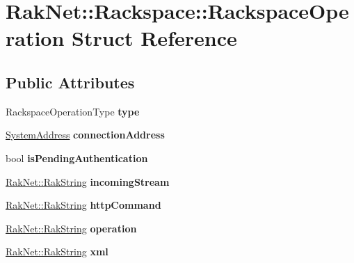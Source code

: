 \hypertarget{struct_rak_net_1_1_rackspace_1_1_rackspace_operation}{\section{Rak\-Net\-:\-:Rackspace\-:\-:Rackspace\-Operation Struct Reference}
\label{struct_rak_net_1_1_rackspace_1_1_rackspace_operation}
}
\subsection*{Public Attributes}
\begin{DoxyCompactItemize}
\item 
\hypertarget{struct_rak_net_1_1_rackspace_1_1_rackspace_operation_a5ea8302225c8b6d16619464995541fa3}{Rackspace\-Operation\-Type {\bfseries type}}\label{struct_rak_net_1_1_rackspace_1_1_rackspace_operation_a5ea8302225c8b6d16619464995541fa3}

\item 
\hypertarget{struct_rak_net_1_1_rackspace_1_1_rackspace_operation_a4ec08c120e483339edbeab83d371fb2f}{\hyperlink{struct_rak_net_1_1_system_address}{System\-Address} {\bfseries connection\-Address}}\label{struct_rak_net_1_1_rackspace_1_1_rackspace_operation_a4ec08c120e483339edbeab83d371fb2f}

\item 
\hypertarget{struct_rak_net_1_1_rackspace_1_1_rackspace_operation_afb13a23f6f4824874e5d565db931e661}{bool {\bfseries is\-Pending\-Authentication}}\label{struct_rak_net_1_1_rackspace_1_1_rackspace_operation_afb13a23f6f4824874e5d565db931e661}

\item 
\hypertarget{struct_rak_net_1_1_rackspace_1_1_rackspace_operation_a703214a16d545c858e59ff0ed070d00b}{\hyperlink{class_rak_net_1_1_rak_string}{Rak\-Net\-::\-Rak\-String} {\bfseries incoming\-Stream}}\label{struct_rak_net_1_1_rackspace_1_1_rackspace_operation_a703214a16d545c858e59ff0ed070d00b}

\item 
\hypertarget{struct_rak_net_1_1_rackspace_1_1_rackspace_operation_a074eaac256b3950de39c99daab37ec4f}{\hyperlink{class_rak_net_1_1_rak_string}{Rak\-Net\-::\-Rak\-String} {\bfseries http\-Command}}\label{struct_rak_net_1_1_rackspace_1_1_rackspace_operation_a074eaac256b3950de39c99daab37ec4f}

\item 
\hypertarget{struct_rak_net_1_1_rackspace_1_1_rackspace_operation_a8fb04b048276f0fe9e17e87cd62b4899}{\hyperlink{class_rak_net_1_1_rak_string}{Rak\-Net\-::\-Rak\-String} {\bfseries operation}}\label{struct_rak_net_1_1_rackspace_1_1_rackspace_operation_a8fb04b048276f0fe9e17e87cd62b4899}

\item 
\hypertarget{struct_rak_net_1_1_rackspace_1_1_rackspace_operation_a2ce74b024eea48d84a3103c3fa0b8ef0}{\hyperlink{class_rak_net_1_1_rak_string}{Rak\-Net\-::\-Rak\-String} {\bfseries xml}}\label{struct_rak_net_1_1_rackspace_1_1_rackspace_operation_a2ce74b024eea48d84a3103c3fa0b8ef0}

\end{DoxyCompactItemize}


